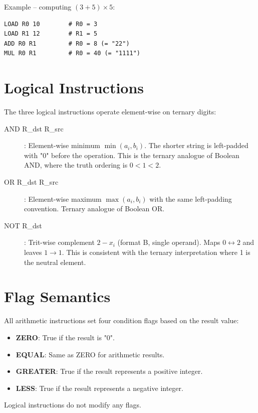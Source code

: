 \documentclass[12pt,a4paper,twoside]{book}
\theoremstyle{trinarytheorem}
\theoremstyle{trinarydefinition}
\newcommand{\code}[1]{\textsf{#1}}
\begin{document}
Example -- computing $(3 + 5) \times 5$:
\begin{lstlisting}
LOAD R0 10        # R0 = 3
LOAD R1 12        # R1 = 5
ADD R0 R1         # R0 = 8 (= "22")
MUL R0 R1         # R0 = 40 (= "1111")
\end{lstlisting}

\section{Logical Instructions}

The three logical instructions operate element-wise on ternary digits:

\begin{description}
    \item[\code{AND R\_dst R\_src}]: Element-wise minimum $\min(a_i, b_i)$. The
          shorter string is left-padded with \code{"0"} before the operation.
          This is the ternary analogue of Boolean AND, where the truth ordering is
          $0 < 1 < 2$.
    \item[\code{OR R\_dst R\_src}]: Element-wise maximum $\max(a_i, b_i)$ with
          the same left-padding convention. Ternary analogue of Boolean OR.
    \item[\code{NOT R\_dst}]: Trit-wise complement $2 - x_i$ (format B, single
          operand). Maps $0 \leftrightarrow 2$ and leaves $1 \rightarrow 1$.
          This is consistent with the ternary interpretation where 1 is the neutral
          element.
\end{description}

\section{Flag Semantics}

All arithmetic instructions set four condition flags based on the result value:
\begin{itemize}
    \item \textbf{ZERO}: True if the result is \code{"0"}.
    \item \textbf{EQUAL}: Same as ZERO for arithmetic results.
    \item \textbf{GREATER}: True if the result represents a positive integer.
    \item \textbf{LESS}: True if the result represents a negative integer.
\end{itemize}
Logical instructions do not modify any flags.

\end{document}
